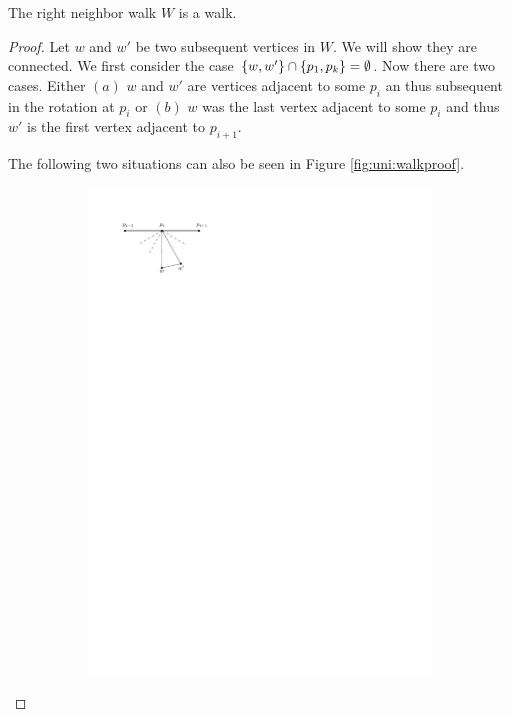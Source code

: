     \begin{lemma}
      \label{lm:uni:neighborWalk}
      The right neighbor walk $W$ is a walk.
    \end{lemma}
    \begin{proof}
      Let $w$ and $w'$ be two subsequent vertices in $W$. We will show they are connected. We first consider the case $\left\lbrace {w, w'} \right\rbrace \cap \left\lbrace {p_1, p_k } \right\rbrace = \emptyset$.
      Now there are two cases. Either $(a)$ $w$ and $w'$ are vertices adjacent to some $p_i$ an thus subsequent in the rotation at $p_i$  or $(b)$ $w$ was the last vertex adjacent to some $p_i$ and thus $w'$ is the first vertex adjacent to $p_{i+1}$.

      The following two situations can also be seen in Figure \ref{fig:uni:walkproof}.

      \begin{figure}[h]
          \centering
          \begin{subfigure}[b]{0.5\linewidth}
              \includegraphics[width=\linewidth]{unifiedAlgo/img/walkProofA}

\end{subfigure}
\end{figure}
\end{proof}

